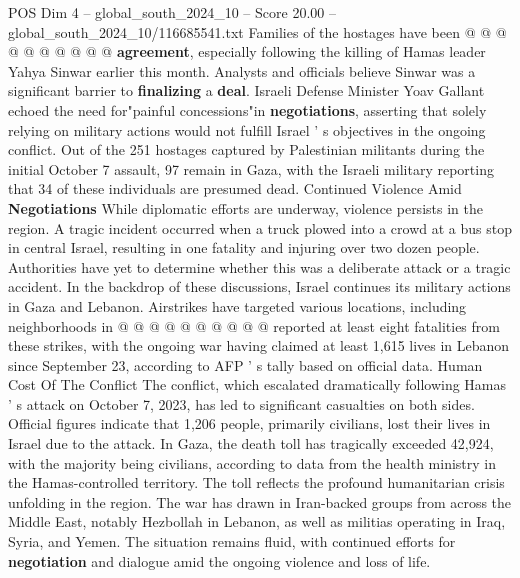 \begin{textsample}{POS Dim 4 – global\_south\_2024\_10 – Score 20.00 – global\_south\_2024\_10/116685541.txt}
Families of the hostages have been @ @ @ @ @ @ @ @ @ @ \textbf{agreement}, especially following the killing of Hamas leader Yahya Sinwar earlier this month.
Analysts and officials believe Sinwar was a significant barrier to \textbf{finalizing} a \textbf{deal}.
Israeli Defense Minister Yoav Gallant echoed the need for"painful concessions"in \textbf{negotiations}, asserting that solely relying on military actions would not fulfill Israel ' s objectives in the ongoing conflict.
Out of the 251 hostages captured by Palestinian militants during the initial October 7 assault, 97 remain in Gaza, with the Israeli military reporting that 34 of these individuals are presumed dead.
Continued Violence Amid \textbf{Negotiations} While diplomatic efforts are underway, violence persists in the region.
A tragic incident occurred when a truck plowed into a crowd at a bus stop in central Israel, resulting in one fatality and injuring over two dozen people.
Authorities have yet to determine whether this was a deliberate attack or a tragic accident.
In the backdrop of these discussions, Israel continues its military actions in Gaza and Lebanon.
Airstrikes have targeted various locations, including neighborhoods in @ @ @ @ @ @ @ @ @ @ reported at least eight fatalities from these strikes, with the ongoing war having claimed at least 1,615 lives in Lebanon since September 23, according to AFP ' s tally based on official data.
Human Cost Of The Conflict The conflict, which escalated dramatically following Hamas ' s attack on October 7, 2023, has led to significant casualties on both sides.
Official figures indicate that 1,206 people, primarily civilians, lost their lives in Israel due to the attack.
In Gaza, the death toll has tragically exceeded 42,924, with the majority being civilians, according to data from the health ministry in the Hamas-controlled territory.
The toll reflects the profound humanitarian crisis unfolding in the region.
The war has drawn in Iran-backed groups from across the Middle East, notably Hezbollah in Lebanon, as well as militias operating in Iraq, Syria, and Yemen.
The situation remains fluid, with continued efforts for \textbf{negotiation} and dialogue amid the ongoing violence and loss of life.

\end{textsample}
